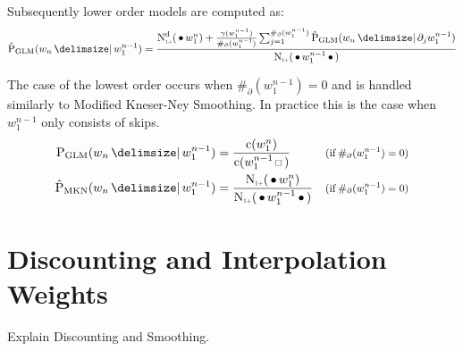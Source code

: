 Subsequently lower order models are computed as:
\begin{equation}
  \label{eq:glm-low}
  \ProbGLM*{w_n}{w_1^{n-1}} =
    \frac{\DiscountedCount*(\WSkp w_1^n) + \frac{\gamma(w_1^{n-1})}{\#_\partial(w_1^{n-1})}
                                     \sum_{j=1}^{\#_\partial(w_1^{n-1})} \ProbGLM*{w_n}{\partial_j w_1^{n-1}}}
         {\ContCountIp(\WSkp w_1^{n-1} \WSkp)}
\end{equation}

The case of the lowest order occurs when $\#_\partial(w_1^{n-1}) = 0$ and is
handled similarly to Modified Kneser-Ney Smoothing.
In practice this is the case when $w_1^{n-1}$ only consists of skips.
\begin{subequations}
  \label{eq:glm-lowest}
  \begin{align}
    \ProbGLM {w_n}{w_1^{n-1}} &= \frac{\Count(w_1^n)}{\Count(w_1^{n-1} \Skp)}
      & \Condition{\#_\partial(w_1^{n-1}) = 0} \\
    \ProbMKN*{w_n}{w_1^{n-1}} &= \frac{\ContCountIp(\WSkp w_1^n)}{\ContCountIp(\WSkp w_1^{n-1} \WSkp)}
      & \Condition{\#_\partial(w_1^{n-1}) = 0}
  \end{align}
\end{subequations}

\section{Discounting and Interpolation Weights}
\label{sec:discounts-interpolation-weights}

\begin{draft}
Explain Discounting and Smoothing.
\end{draft}

